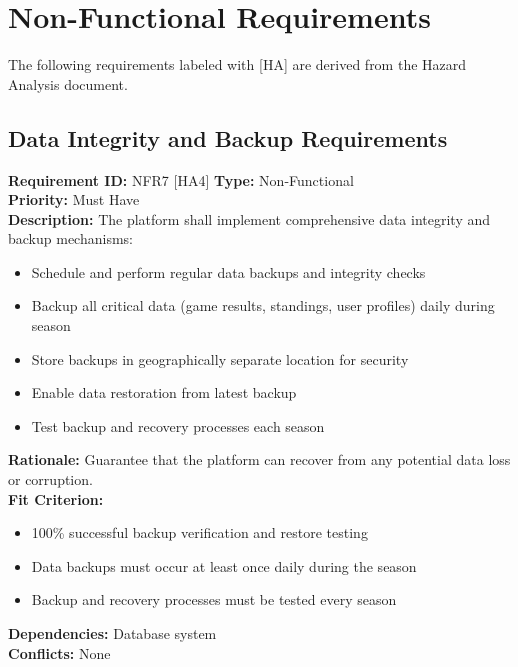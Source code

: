 \documentclass[12pt, titlepage]{article}
\begin{document}
\section{Non-Functional Requirements}
The following requirements labeled with [HA] are derived from the Hazard Analysis document.

\subsection{Data Integrity and Backup Requirements}
\textbf{Requirement ID:} NFR7 [HA4] \quad \textbf{Type:} Non-Functional \\
\textbf{Priority:} Must Have \\
\textbf{Description:} The platform shall implement comprehensive data integrity and backup mechanisms:
\begin{itemize}
    \item Schedule and perform regular data backups and integrity checks
    \item Backup all critical data (game results, standings, user profiles) daily during season
    \item Store backups in geographically separate location for security
    \item Enable data restoration from latest backup
    \item Test backup and recovery processes each season
\end{itemize}
\textbf{Rationale:} Guarantee that the platform can recover from any potential data loss or corruption.\\
\textbf{Fit Criterion:} 
\begin{itemize}
    \item 100\% successful backup verification and restore testing
    \item Data backups must occur at least once daily during the season
    \item Backup and recovery processes must be tested every season
\end{itemize}
\textbf{Dependencies:} Database system\\
\textbf{Conflicts:} None\\
\end{document}
